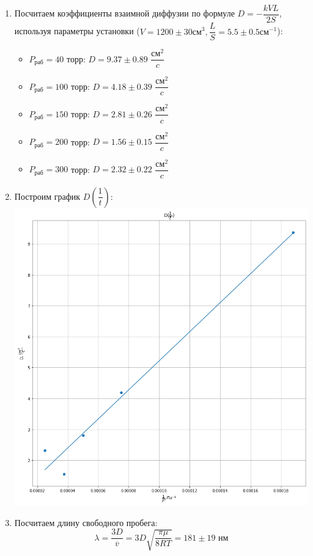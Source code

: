 \documentclass[12pt,a4paper]{article}
\begin{document}
\begin{enumerate}
		\item Посчитаем коэффициенты взаимной диффузии по формуле $D = -\dfrac{kVL}{2S}$, используя параметры установки ($V = 1200 \pm 30 см^3, \dfrac{L}{S} = 5.5 \pm 0.5 см^{-1}$):
			\begin{itemize}
				\item $P_{раб} = 40$ торр: $D = 9.37 \pm 0.89$ $\dfrac{см^2}{c}$
				
				\item $P_{раб} = 100$ торр: $D = 4.18 \pm 0.39$ $\dfrac{см^2}{c}$
				
				\item $P_{раб} = 150$ торр: $D = 2.81 \pm 0.26$ $\dfrac{см^2}{c}$
				
				\item $P_{раб} = 200$ торр: $D = 1.56 \pm 0.15$ $\dfrac{см^2}{c}$
				
				\item $P_{раб} = 300$ торр: $D = 2.32 \pm 0.22$ $\dfrac{см^2}{c}$
			\end{itemize}
			
		\item Построим график $D\left(\dfrac{1}{t} \right)$:\\
			\includegraphics[scale=0.5]{dp.png}
			
		\item Посчитаем длину свободного пробега: \\
			\begin{equation*}
				\lambda = \dfrac{3D}{\overline{v}} = 3D \sqrt{\dfrac{\pi \mu}{8RT}} = 181 \pm 19 \text{ нм}
			\end{equation*}
			

\end{enumerate}
\end{document}
